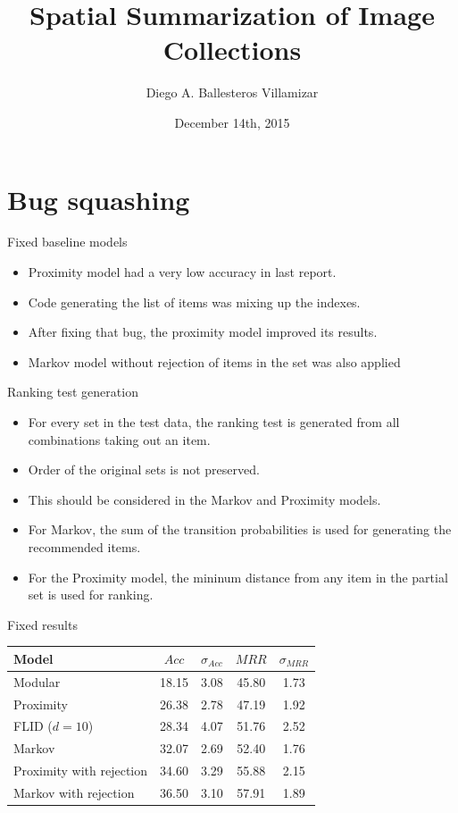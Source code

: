 \documentclass{beamer}
\title[M.Sc. Thesis 2015]{Spatial Summarization of Image Collections}
\author{Diego A. Ballesteros Villamizar}
\institute[ETHZ]{ETH Zürich}
\date{December 14th, 2015}
\begin{document}
  \begin{frame}
    \titlepage
  \end{frame}
  
  \section{Bug squashing}
  
  \begin{frame}{Fixed baseline models}
    \begin{itemize}
      \item Proximity model had a very low accuracy in last report.
      \item Code generating the list of items was mixing up the indexes.
      \item After fixing that bug, the proximity model improved its results.
      \item Markov model without rejection of items in the set was also applied
    \end{itemize}
  \end{frame}
  
  \begin{frame}{Ranking test generation}
    \begin{itemize}
      \item For every set in the test data, the ranking test is generated from all combinations taking out an item.
      \item Order of the original sets is not preserved.
      \item This should be considered in the Markov and Proximity models.
      \item For Markov, the sum of the transition probabilities is used for generating the recommended items.
      \item For the Proximity model, the mininum distance from any item in the partial set is used for ranking.
    \end{itemize}
  \end{frame}
  
  \begin{frame}{Fixed results}
    \begin{table}
      \begin{tabularx}{0.7\textwidth}{X|c|c|c|c}
        Model         & $Acc$ & $\sigma_{Acc}$ & $MRR$ & $\sigma_{MRR}$ \\
        \hline
        Modular       & 18.15 & 3.08           & 45.80 & 1.73 \\
        Proximity     & 26.38 & 2.78           & 47.19 & 1.92 \\
        FLID ($d=10$) & 28.34 & 4.07           & 51.76 & 2.52 \\
        Markov        & 32.07 & 2.69           & 52.40 & 1.76 \\
        Proximity with rejection     & 34.60 & 3.29           & 55.88 & 2.15 \\
        Markov with rejection & 36.50 & 3.10           & 57.91 & 1.89
      \end{tabularx}
    \end{table}
  \end{frame}
  
\end{document}
